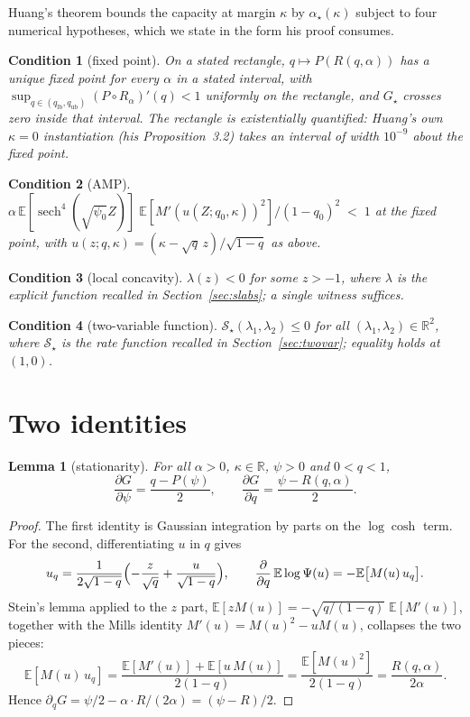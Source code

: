 \documentclass[11pt]{article}
\newtheorem{lemma}{Lemma}
\newtheorem{cond}{Condition}
\theoremstyle{remark}
\newcommand{\E}{\mathbb{E}}
\newcommand{\R}{\mathbb{R}}
\newcommand{\sS}{\mathcal{S}}
\DeclareMathOperator{\sech}{sech}
\begin{document}
Huang's theorem bounds the capacity at margin $\kappa$ by
$\alpha_\star(\kappa)$ subject to four numerical hypotheses, which we
state in the form his proof consumes.

\begin{cond}[fixed point]\label{cond:fp}
On a stated rectangle, $q\mapsto P(R(q,\alpha))$ has a unique fixed
point for every $\alpha$ in a stated interval, with
$\sup_{q\in(q_{\mathrm{lb}},q_{\mathrm{ub}})}(P\circ R_\alpha)'(q)<1$
uniformly on the rectangle, and $G_\star$ crosses zero inside that
interval.  The rectangle is existentially quantified: Huang's own
$\kappa=0$ instantiation (his Proposition~3.2) takes an interval of
width $10^{-9}$ about the fixed point.
\end{cond}

\begin{cond}[AMP]\label{cond:amp}
$\alpha\,\E[\sech^4(\sqrt{\psi_0}Z)]\;
\E[M'(u(Z;q_0,\kappa))^2]/(1-q_0)^2\;<\;1$ at the fixed point,
with $u(z;q,\kappa)=(\kappa-\sqrt q\,z)/\sqrt{1-q}$ as above.
\end{cond}

\begin{cond}[local concavity]\label{cond:lc}
$\lambda(z)<0$ for some $z>-1$, where $\lambda$ is the explicit
function recalled in Section~\ref{sec:slabs}; a single witness
suffices.
\end{cond}

\begin{cond}[two-variable function]\label{cond:2var}
$\sS_\star(\lambda_1,\lambda_2)\le0$ for all
$(\lambda_1,\lambda_2)\in\R^2$, where $\sS_\star$ is the rate
function recalled in Section~\ref{sec:twovar}; equality holds at
$(1,0)$.
\end{cond}

\section{Two identities}\label{sec:identities}

\begin{lemma}[stationarity]\label{lem:stat}
For all $\alpha>0$, $\kappa\in\R$, $\psi>0$ and $0<q<1$,
\[
\frac{\partial G}{\partial\psi}=\frac{q-P(\psi)}{2},
\qquad
\frac{\partial G}{\partial q}=\frac{\psi-R(q,\alpha)}{2}.
\]
\end{lemma}

\begin{proof}
The first identity is Gaussian integration by parts on the
$\log\cosh$ term.  For the second, differentiating $u$ in $q$ gives
\[
u_q=\frac{1}{2\sqrt{1-q}}
\Bigl(-\frac{z}{\sqrt q}+\frac{u}{\sqrt{1-q}}\Bigr),
\qquad
\frac{\partial}{\partial q}\,\E\log\Psi(u)=-\E\bigl[M(u)\,u_q\bigr].
\]
Stein's lemma applied to the $z$ part,
$\E[zM(u)]=-\sqrt{q/(1-q)}\;\E[M'(u)]$, together with the Mills
identity $M'(u)=M(u)^2-uM(u)$, collapses the two pieces:
\[
\E[M(u)\,u_q]
=\frac{\E[M'(u)]+\E[u\,M(u)]}{2(1-q)}
=\frac{\E[M(u)^2]}{2(1-q)}
=\frac{R(q,\alpha)}{2\alpha}.
\]
Hence $\partial_q G=\psi/2-\alpha\cdot R/(2\alpha)=(\psi-R)/2$.
\end{proof}
\end{document}

